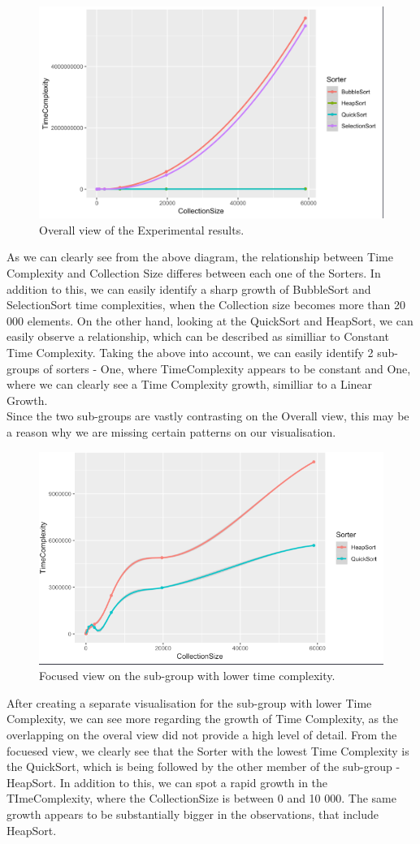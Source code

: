 \documentclass[]{report}
\begin{document}
\begin{figure}
	\centering
	\includegraphics[width=0.7\linewidth]{ResultsOverallView}
	\caption[Figure 3.1:]{Overall view of the Experimental results.}
	\label{fig:resultsoverallview}
\end{figure}
\newpage
As we can clearly see from the above diagram, the relationship between Time Complexity and Collection Size differes between each one of the Sorters. In addition to this, we can easily identify a sharp growth of BubbleSort and SelectionSort time complexities, when the Collection size becomes more than 20 000 elements. On the other hand, looking at the QuickSort and HeapSort, we can easily observe a relationship, which can be described as similliar to Constant Time Complexity.
Taking the above into account, we can easily identify 2 sub-groups of sorters - One, where  TimeComplexity appears to be constant and One, where we can clearly see a Time Complexity growth, similliar to a Linear Growth.\\
Since the two sub-groups are vastly contrasting on the Overall view, this may be a reason why we are missing certain patterns on our visualisation.

\begin{figure}
	\centering
	\includegraphics[width=0.7\linewidth]{OverviewOfConstantTimeComplexityAlgorithms}
	\caption[Figure 3.2]{Focused view on the sub-group with lower time complexity.}
	\label{fig:overviewofconstanttimecomplexityalgorithms}
\end{figure}
\newpage	
After creating a separate visualisation for the sub-group with lower Time Complexity, we can see more regarding the growth of Time Complexity, as the overlapping on the overal view did not provide a high level of detail. From the focuesed view, we clearly see that the Sorter with the lowest Time Complexity is the QuickSort, which is being followed by the other member of the sub-group - HeapSort. In addition to this, we can spot a rapid growth in the TImeComplexity, where the CollectionSize is between 0 and 10 000. The same growth appears to be substantially bigger in the observations, that include HeapSort.
\end{document}
